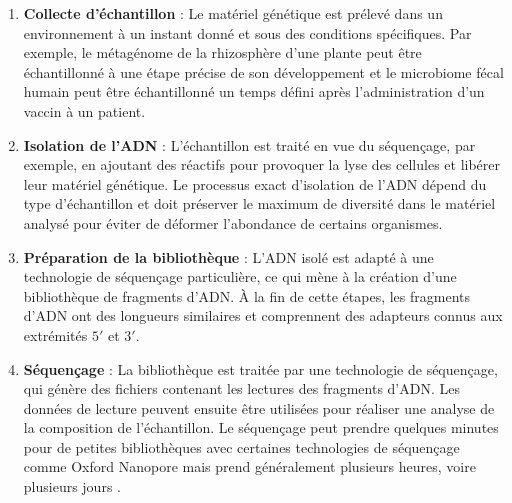 \begin{enumerate}
    \item \textbf{Collecte d'échantillon} : Le matériel génétique est prélevé
        dans un environnement à un instant donné et sous des conditions
        spécifiques. Par exemple, le métagénome de la rhizosphère d'une plante
        peut être échantillonné à une étape précise de son développement et le
        microbiome fécal humain peut être échantillonné un temps défini après
        l'administration d'un vaccin à un patient.
    \item \textbf{Isolation de l'ADN} : L'échantillon est traité en vue du
        séquençage, par exemple, en ajoutant des réactifs pour provoquer la
        lyse des cellules et libérer leur matériel génétique. Le processus exact
        d'isolation de l'ADN dépend du type d'échantillon et doit préserver le
        maximum de diversité dans le matériel analysé pour éviter de déformer l'abondance
        de certains organismes.
    \item \textbf{Préparation de la bibliothèque} : L'ADN isolé est adapté à
        une technologie de séquençage particulière, ce qui mène à la création
        d'une bibliothèque de fragments d'ADN. À la fin de cette étapes, les
        fragments d'ADN ont des longueurs similaires et comprennent des adapteurs
        connus aux extrémités $5'$ et $3'$.
    \item \textbf{Séquençage} : La bibliothèque est traitée par une technologie
        de séquençage, qui génère des fichiers contenant les lectures des
        fragments d'ADN. Les données de lecture peuvent ensuite être utilisées
        pour réaliser une analyse de la composition de l'échantillon. Le
        séquençage peut prendre quelques minutes pour de petites bibliothèques
        avec certaines technologies de séquençage comme Oxford Nanopore mais
        prend généralement plusieurs heures, voire plusieurs jours \cite{roy2024}.
\end{enumerate}

